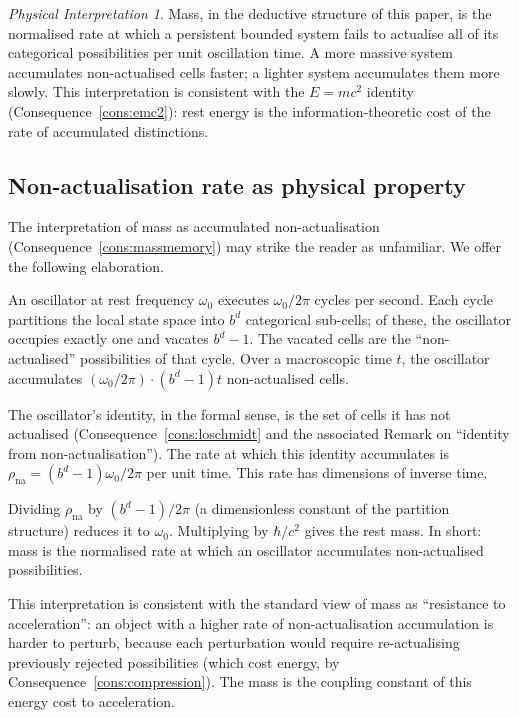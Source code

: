 \documentclass[11pt,twocolumn,a4paper]{article}
\theoremstyle{axiomstyle}
\theoremstyle{conseqstyle}
\theoremstyle{definition}
\theoremstyle{remark}
\newtheorem*{interpretation}{Physical Interpretation}
\begin{document}
\begin{interpretation}
Mass, in the deductive structure of this paper, is the normalised rate at which a persistent bounded system fails to actualise all of its categorical possibilities per unit oscillation time. A more massive system accumulates non-actualised cells faster; a lighter system accumulates them more slowly. This interpretation is consistent with the $E=mc^{2}$ identity (Consequence~\ref{cons:emc2}): rest energy is the information-theoretic cost of the rate of accumulated distinctions.
\end{interpretation}

\subsection{Non-actualisation rate as physical property}

The interpretation of mass as accumulated non-actualisation (Consequence~\ref{cons:massmemory}) may strike the reader as unfamiliar. We offer the following elaboration.

An oscillator at rest frequency $\omega_{0}$ executes $\omega_{0}/2\pi$ cycles per second. Each cycle partitions the local state space into $b^{d}$ categorical sub-cells; of these, the oscillator occupies exactly one and vacates $b^{d}-1$. The vacated cells are the ``non-actualised'' possibilities of that cycle. Over a macroscopic time $t$, the oscillator accumulates $(\omega_{0}/2\pi)\cdot(b^{d}-1)t$ non-actualised cells.

The oscillator's identity, in the formal sense, is the set of cells it has not actualised (Consequence~\ref{cons:loschmidt} and the associated Remark on ``identity from non-actualisation''). The rate at which this identity accumulates is $\rho_{\text{na}}=(b^{d}-1)\omega_{0}/2\pi$ per unit time. This rate has dimensions of inverse time.

Dividing $\rho_{\text{na}}$ by $(b^{d}-1)/2\pi$ (a dimensionless constant of the partition structure) reduces it to $\omega_{0}$. Multiplying by $\hbar/c^{2}$ gives the rest mass. In short: mass is the normalised rate at which an oscillator accumulates non-actualised possibilities.

This interpretation is consistent with the standard view of mass as ``resistance to acceleration'': an object with a higher rate of non-actualisation accumulation is harder to perturb, because each perturbation would require re-actualising previously rejected possibilities (which cost energy, by Consequence~\ref{cons:compression}). The mass is the coupling constant of this energy cost to acceleration.
\end{document}
